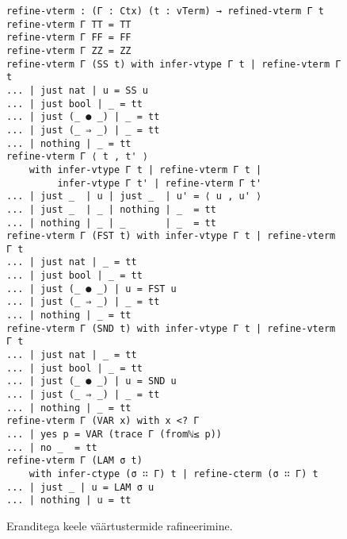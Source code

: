 \documentclass[a4paper,12pt]{article}
\begin{document}
\begin{figure}
  \begin{BVerbatim}
refine-vterm : (Γ : Ctx) (t : vTerm) → refined-vterm Γ t 
refine-vterm Γ TT = TT
refine-vterm Γ FF = FF
refine-vterm Γ ZZ = ZZ
refine-vterm Γ (SS t) with infer-vtype Γ t | refine-vterm Γ t
... | just nat | u = SS u
... | just bool | _ = tt
... | just (_ ● _) | _ = tt
... | just (_ ⇒ _) | _ = tt
... | nothing | _ = tt
refine-vterm Γ ⟨ t , t' ⟩
    with infer-vtype Γ t | refine-vterm Γ t |
         infer-vtype Γ t' | refine-vterm Γ t'
... | just _  | u | just _  | u' = ⟨ u , u' ⟩
... | just _  | _ | nothing | _  = tt
... | nothing | _ | _       | _  = tt
refine-vterm Γ (FST t) with infer-vtype Γ t | refine-vterm Γ t
... | just nat | _ = tt
... | just bool | _ = tt
... | just (_ ● _) | u = FST u
... | just (_ ⇒ _) | _ = tt
... | nothing | _ = tt
refine-vterm Γ (SND t) with infer-vtype Γ t | refine-vterm Γ t
... | just nat | _ = tt
... | just bool | _ = tt
... | just (_ ● _) | u = SND u
... | just (_ ⇒ _) | _ = tt
... | nothing | _ = tt
refine-vterm Γ (VAR x) with x <? Γ
... | yes p = VAR (trace Γ (fromℕ≤ p))
... | no _  = tt
refine-vterm Γ (LAM σ t)
    with infer-ctype (σ ∷ Γ) t | refine-cterm (σ ∷ Γ) t
... | just _ | u = LAM σ u
... | nothing | u = tt
  \end{BVerbatim}
  \caption{Eranditega keele väärtustermide rafineerimine.}
  \label{fig:exc.refine-vterm}
\end{figure}
\end{document}

